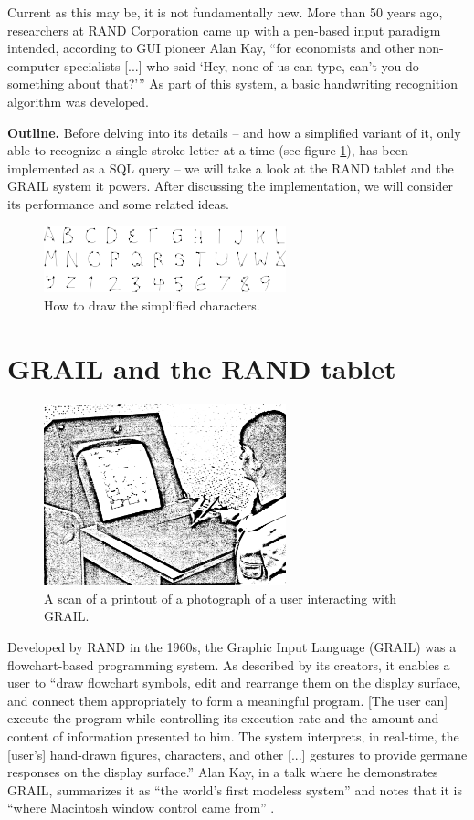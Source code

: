 \documentclass[sigconf]{acmart}
\begin{document}
Current as this may be, it is not fundamentally new. More than 50 years ago, researchers at RAND Corporation came up with a pen-based input paradigm intended, according to GUI pioneer Alan Kay, \enquote{for economists and other non-computer specialists [...] who said \enquote{Hey, none of us can type, can't you do something about that?}} \cite{kay} As part of this system, a basic handwriting recognition algorithm was developed. \cite{groner,schaedler}

\textbf{Outline.} Before delving into its details – and how a simplified variant of it, only able to recognize a single-stroke letter at a time (see figure \ref{chars}), has been implemented as a SQL query – we will take a look at the RAND tablet and the GRAIL system it powers. After discussing the implementation, we will consider its performance and some related ideas.

\begin{figure}[pb]
  \centering
  \includegraphics[width=7cm]{drawingguide}
  \caption{How to draw the simplified characters.}
  \label{chars}
\end{figure}

\section{GRAIL and the RAND tablet}

\begin{figure}[tpb]
  \centering
  \includegraphics[width=7cm]{grailconsole}
  \caption{A scan \cite{grail} of a printout of a photograph of a user interacting with GRAIL.}
  \label{grailconsole}
\end{figure}

Developed by RAND in the 1960s, the Graphic Input Language (GRAIL) was a flowchart-based programming system. \cite{grail} As described by its creators, it enables a user to \enquote{draw flowchart symbols, edit and rearrange them on the display surface, and connect them appropriately to form a meaningful program. [The user can] execute the program while controlling its execution rate and the amount and content of information presented to him. The system interprets, in real-time, the [user's] hand-drawn figures, characters, and other [...] gestures to provide germane responses on the display surface.} \cite{grailang} Alan Kay, in a talk where he demonstrates GRAIL, summarizes it as \enquote{the world's first modeless system} and notes that it is \enquote{where Macintosh window control came from} \cite{kay}.
\end{document}

